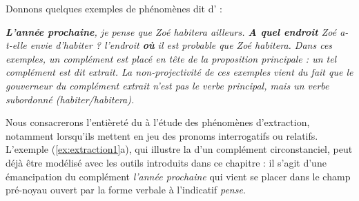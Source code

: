 {
Donnons quelques exemples de phénomènes dit d' :

\ea\label{ex:extraction1}
\ea \itshape \textbf{L’année  prochaine},  je pense que Zoé habitera ailleurs.
\ex \itshape \textbf{A quel endroit}  Zoé a-t-elle envie d’habiter ?
\ex \itshape l’endroit \textbf{où}  il est probable que Zoé habitera.
\z
\z
Dans ces exemples, un complément est placé en tête de la proposition principale : un tel complément est dit extrait. La non-projectivité de ces exemples vient du fait que le gouverneur du complément extrait n'est pas le verbe principal, mais un verbe subordonné (\textit{habiter/habitera}).

Nous consacrerons l’entièreté du   à l’étude des phénomènes d'extraction, notamment lorsqu’ils mettent en jeu des pronoms interrogatifs ou relatifs. L'exemple (\ref{ex:extraction1}a), qui illustre la  d’un complément circonstanciel, peut déjà être modélisé avec les outils introduits dans ce chapitre : il s’agit d’une émancipation du complément \textit{l'année prochaine} qui vient se placer dans le champ pré-noyau ouvert par la forme verbale à l’indicatif \textit{pense}.}%

